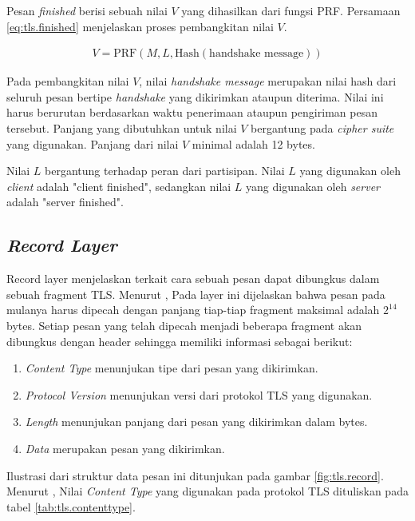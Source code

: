 Pesan \emph{finished} berisi sebuah nilai $V$ yang dihasilkan dari fungsi PRF. Persamaan \ref{eq:tls.finished} menjelaskan proses pembangkitan nilai $V$.

\begin{equation}
  \label{eq:tls.finished}
  \begin{array}{l}
    V = \text{PRF}(M, L, \text{Hash}(\text{handshake message}))
  \end{array}
\end{equation}

Pada pembangkitan nilai $V$, nilai \emph{handshake message} merupakan nilai hash dari seluruh pesan bertipe \emph{handshake} yang dikirimkan ataupun diterima. Nilai ini harus berurutan berdasarkan waktu penerimaan ataupun pengiriman pesan tersebut. Panjang yang dibutuhkan untuk nilai $V$ bergantung pada \emph{cipher suite} yang digunakan. Panjang dari nilai $V$ minimal adalah 12 bytes.

Nilai $L$ bergantung terhadap peran dari partisipan. Nilai $L$ yang digunakan oleh \emph{client} adalah "client finished", sedangkan nilai $L$ yang digunakan oleh \emph{server} adalah "server finished".

\subsection{\emph{Record Layer}}
Record layer menjelaskan terkait cara sebuah pesan dapat dibungkus dalam sebuah fragment TLS. Menurut \textcite{rfc5246}, Pada layer ini dijelaskan bahwa pesan pada mulanya harus dipecah dengan panjang tiap-tiap fragment maksimal adalah $2^14$ bytes. Setiap pesan yang telah dipecah menjadi beberapa fragment akan dibungkus dengan header sehingga memiliki informasi sebagai berikut:

\begin{enumerate}
  \item \emph{Content Type} menunjukan tipe dari pesan yang dikirimkan.
  \item \emph{Protocol Version} menunjukan versi dari protokol TLS yang digunakan.
  \item \emph{Length} menunjukan panjang dari pesan yang dikirimkan dalam bytes.
  \item \emph{Data} merupakan pesan yang dikirimkan.
\end{enumerate}

Ilustrasi dari struktur data pesan ini ditunjukan pada gambar \ref{fig:tls.record}. Menurut \textcite{rfc5246}, Nilai \emph{Content Type} yang digunakan pada protokol TLS dituliskan pada tabel \ref{tab:tls.contenttype}.

